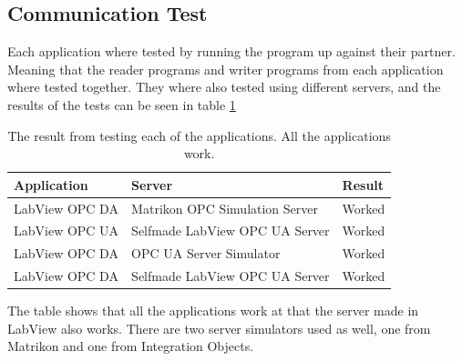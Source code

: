 \documentclass[11pt, A4paper, english]{article}
\begin{document}
		\subsection{Communication Test}
Each application where tested by running the program up against their partner. Meaning that the reader programs and writer programs from each application where tested together. They where also tested using different servers, and the results of the tests can be seen in table \ref{tb:res}
			\begin{table}

\noindent 		\begin{tabularx}{\linewidth}{@{}|X|X|X|}
\hline
Application    & Server                                         & Result \\
\hline
LabView OPC DA & Matrikon OPC Simulation Server \cite{Matrikon}	& Worked \\
LabView OPC UA & Selfmade LabView OPC UA Server					& Worked \\
LabView OPC DA & OPC UA Server Simulator \cite{IO}	            & Worked \\
LabView OPC DA & Selfmade LabView OPC UA Server 				& Worked \\
\hline
				\end{tabularx}
\caption{The result from testing each of the applications. All the applications work.}
\label{tb:res}
			\end{table}
The table shows that all the applications work at that the server made in LabView also works. There are two server simulators used as well, one from Matrikon and one from Integration Objects.
\end{document}
